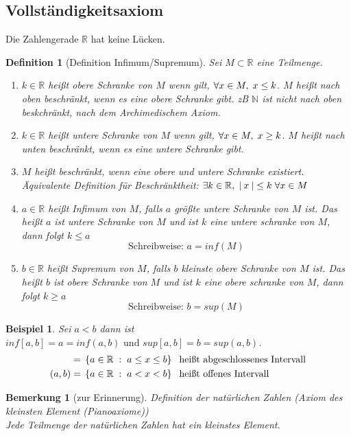 \documentclass[a4paper,titlepage,oneside]{article}
\def\N{\ensuremath{\mathbb{N}} }
\def\R{\ensuremath{\mathbb{R}} }
\def\fa{\ensuremath{\forall}}
\def\sp{\hspace{0,1cm}}
\newcommand{\abs}[1]{\ensuremath{\left|\:#1\:\right|}}
\newcommand{\menge}[2]{\ensuremath{\left\{#1\sp : \sp #2\right\}}}
\theoremstyle{thmstyle}
\theoremstyle{subthmstyle}
\newtheorem{subdefi}[subsatz]{Definition}
\newtheorem{subbsp}[subsatz]{Beispiel}
\newtheorem{subbem}[subsatz]{Bemerkung}
\begin{document}
\subsection{Vollständigkeitsaxiom}
Die Zahlengerade \R hat keine Lücken.

\begin{subdefi}[Definition Infimum/Supremum]
Sei \(M \subset \R\) eine Teilmenge.
\begin{enumerate}
	\item \(k \in \R\) heißt obere Schranke von \(M\) wenn gilt, \(\fa x \in M,\sp x \le k\). \(M\) heißt nach oben beschränkt,
		wenn es eine obere Schranke gibt. zB \N ist nicht nach oben beskchränkt, nach dem Archimedischem Axiom.
	\item \(k \in \R \) heißt untere Schranke von \(M\) wenn gilt, \(\fa x \in M,\sp x \ge k\). \(M\) heißt nach unten beschränkt,
		wenn es eine untere Schranke gibt.
	\item \(M\) heißt beschränkt, wenn eine obere und untere Schranke existiert.  Äquivalente Definition für Beschränktheit:
		\(\exists k \in \R,\sp \abs{x} \le k \sp \fa x \in M\)
	\item \(a \in \R\) heißt Infimum von \(M\), falls \(a\) größte untere Schranke von \(M\) ist. Das heißt \(a\) ist untere Schranke
		von \(M\) und ist \(k\) eine untere schranke von \(M\), dann folgt \(k \le a\)
		\[\text{Schreibweise: } a = inf(M)\]
	\item \(b \in \R\) heißt Supremum von \(M\), falls \(b\) kleinste obere Schranke von \(M\) ist. Das heißt \(b\) ist obere
		Schranke von \(M\) und ist \(k\) eine obere schranke von \(M\), dann folgt \(k \ge a\) \[\text{Schreibweise: } b = sup(M)\]
\end{enumerate}
\end{subdefi}

\begin{subbsp}
Sei \(a < b\) dann ist \(inf[a,b] = a = inf(a,b) \text{ und } sup[a,b] = b = sup(a,b)\).
\begin{align*}
[a, b] = &\sp \menge{a \in \R}{a \le x \le b} \sp \text{ heißt abgeschlossenes Intervall}\\
(a, b) = &\sp \menge{a \in \R}{a < x < b} \sp \text{ heißt offenes Intervall}
\end{align*}
\end{subbsp}

\begin{subbem}[zur Erinnerung]
Definition der natürlichen Zahlen (Axiom des kleinsten Element (Pianoaxiome)) \\
Jede Teilmenge der natürlichen Zahlen hat ein kleinstes Element.
\end{subbem}
\end{document}
